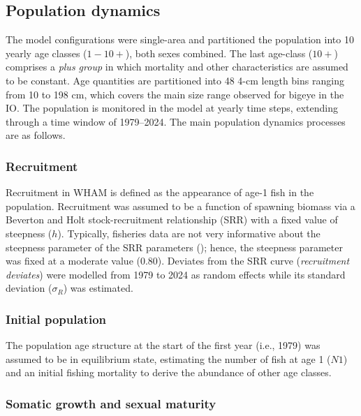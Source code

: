 \documentclass[
]{scrartcl}
\begin{document}
\subsection{Population dynamics}\label{population-dynamics}

The model configurations were single-area and partitioned the population
into 10 yearly age classes (\(1-10+\)), both sexes combined. The last
age-class (\(10+\)) comprises a \emph{plus group} in which mortality and
other characteristics are assumed to be constant. Age quantities are
partitioned into 48 4-cm length bins ranging from 10 to 198 cm, which
covers the main size range observed for bigeye in the IO. The population
is monitored in the model at yearly time steps, extending through a time
window of 1979--2024. The main population dynamics processes are as
follows.

\subsubsection{Recruitment}\label{recruitment}

Recruitment in WHAM is defined as the appearance of age-1 fish in the
population. Recruitment was assumed to be a function of spawning biomass
via a Beverton and Holt stock-recruitment relationship (SRR) with a
fixed value of steepness (\(h\)). Typically, fisheries data are not very
informative about the steepness parameter of the SRR parameters
(); hence, the
steepness parameter was fixed at a moderate value (0.80). Deviates from
the SRR curve (\emph{recruitment deviates}) were modelled from 1979 to
2024 as random effects while its standard deviation (\(\sigma_R\)) was
estimated.

\subsubsection{Initial population}\label{initial-population}

The population age structure at the start of the first year (i.e., 1979)
was assumed to be in equilibrium state, estimating the number of fish at
age 1 (\(N1\)) and an initial fishing mortality to derive the abundance
of other age classes.

\subsubsection{Somatic growth and sexual maturity}\label{sec-growth}
\end{document}
